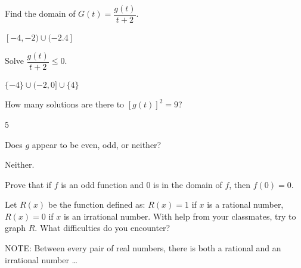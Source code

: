 \documentclass{ximera}
\begin{document}
\begin{question}
\begin{problem}
Find the domain of $G(t) = \dfrac{g(t)}{t+2}$.
\begin{solution}
$[-4,-2) \cup (-2.4]$

\end{solution}

\end{problem}

\begin{problem}
Solve $\dfrac{g(t)}{t+2} \leq 0$.

\begin{solution}
$\{-4\} \cup (-2,0] \cup \{4\}$
\end{solution}

\end{problem}

\begin{problem}
How many solutions are there to $[g(t)]^2 = 9$?
\begin{solution}
$5$
\end{solution}

\end{problem}

\begin{problem}\label{usesecondfuncgraphlast}
Does $g$ appear to be even, odd, or neither?

\begin{solution}
Neither.
\end{solution}
\end{problem}
\end{question}


\begin{problem}
Prove that if $f$ is an odd function and $0$ is in the domain of $f$, then $f(0) = 0$.
\end{problem}

\begin{problem}
Let $R(x)$ be the function defined as:  $R(x) = 1$ if $x$ is a rational number, $R(x) = 0$ if $x$ is an irrational number. With help from your classmates, try to graph $R$.  What difficulties do you encounter?

NOTE:  Between every pair of real numbers, there is both a rational and an irrational number \ldots
\end{problem}
\end{document}
